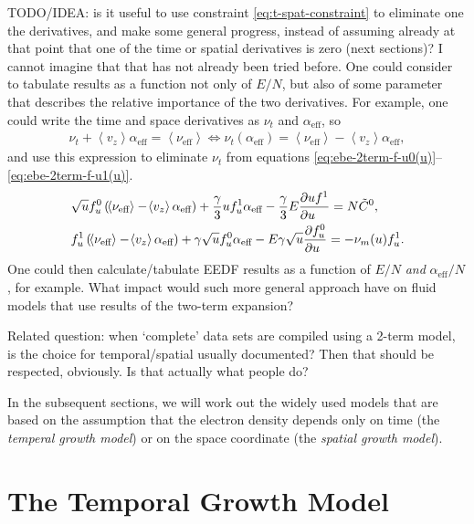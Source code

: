 \documentclass{book}
\newcommand{\MEAN}[1]{\ensuremath{\!\left\langle{{#1}}\right\rangle}}
\begin{document}
\begin{framed}
TODO/IDEA: is it useful to use constraint \eqref{eq:t-spat-constraint} to eliminate one
the derivatives, and make some general progress, instead of assuming already at that point
that one of the time or spatial derivatives is zero (next sections)? I cannot imagine that
that has not already been tried before.
One could consider to tabulate results as a function not only of $E/N$, but also of
some parameter that describes the relative importance of the two derivatives. For example,
one could write the time and space derivatives as $\nu_t$ and $\alpha_{\text{eff}}$, so
\begin{align}
	\nu_t + \MEAN{v_z}\alpha_{\text{eff}} = \MEAN{\nu_{\text{eff}}}
	\iff
	\nu_t(\alpha_{\text{eff}}) = \MEAN{\nu_{\text{eff}}} - \MEAN{v_z}\alpha_{\text{eff}},
\end{align}
and use this expression to eliminate $\nu_t$ from equations
\eqref{eq:ebe-2term-f-u0(u)}--\eqref{eq:ebe-2term-f-u1(u)}.
\begin{align}
	&\sqrt{u}f^0_u\left(\MEAN{\nu_{\text{eff}}} - \MEAN{v_z}\alpha_{\text{eff}}\right)
	+ \frac{\gamma}{3}uf^1_u\alpha_{\text{eff}}
	- \frac{\gamma}{3}E\PDEV{u f^1}{u}
	=  N\tilde{C}^0,
	\\
	&f^1_u\left(\MEAN{\nu_{\text{eff}}} - \MEAN{v_z}\alpha_{\text{eff}}\right)
	+ \gamma \sqrt{u}f^0_u\alpha_{\text{eff}}
	- E\gamma \sqrt{u}\PDEV{f^0_u}{u}
	= -\nu_m(u)f^1_u.
\end{align}
One could then calculate/tabulate EEDF results as a function of $E/N$ {\em and} $\alpha_{\text{eff}}/N$,
for example. What impact would such more general approach have on fluid models that
use results of the two-term expansion?

Related question: when `complete' data sets are compiled using a 2-term model,
is the choice for temporal/spatial usually documented? Then that should be respected,
obviously. Is that actually what people do?
\end{framed}

In the subsequent sections, we will work out the widely used models that are based on
the assumption that the electron density depends only on time (the {\em temperal growth model})
or on the space coordinate (the {\em spatial growth model}).

\section{The Temporal Growth Model}
\label{sec:theory:temp-growth}
\end{document}
